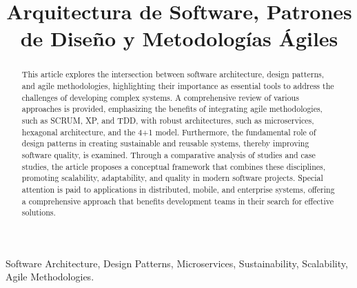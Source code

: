 \documentclass[conference]{IEEEtran}
\begin{document}
\title{Arquitectura de Software, Patrones de Diseño y Metodologías Ágiles}

\author{
}

\maketitle

\begin{abstract}
This article explores the intersection between software architecture, design patterns, and agile methodologies, highlighting their importance as essential tools to address the challenges of developing complex systems. A comprehensive review of various approaches is provided, emphasizing the benefits of integrating agile methodologies, such as SCRUM, XP, and TDD, with robust architectures, such as microservices, hexagonal architecture, and the 4+1 model. Furthermore, the fundamental role of design patterns in creating sustainable and reusable systems, thereby improving software quality, is examined. Through a comparative analysis of studies and case studies, the article proposes a conceptual framework that combines these disciplines, promoting scalability, adaptability, and quality in modern software projects. Special attention is paid to applications in distributed, mobile, and enterprise systems, offering a comprehensive approach that benefits development teams in their search for effective solutions.\\
\end{abstract}

\begin{IEEEkeywords}
Software Architecture, Design Patterns, Microservices, Sustainability, Scalability, Agile Methodologies.\\
\end{IEEEkeywords}
\end{document}
